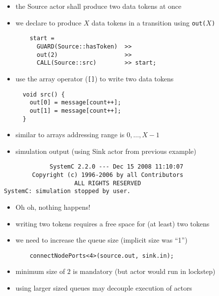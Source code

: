 \begin{frame}[fragile=singleslide]
\begin{itemize}
\item the Source actor shall produce two data tokens at once
\item we declare to produce $X$ data tokens in a transition  using \lstinline!out(!$X$\lstinline!)!
\begin{lstlisting}
    start = 
      GUARD(Source::hasToken)  >>
      out(2)                   >>
      CALL(Source::src)        >> start;
\end{lstlisting}
\item use the array operator (\lstinline![]!) to write two data tokens
\begin{lstlisting}
  void src() {
    out[0] = message[count++];
    out[1] = message[count++];
  }
\end{lstlisting}
\item similar to arrays addressing range is $0, \dots, X-1$
\end{itemize}
\end{frame}





\begin{frame}[fragile=singleslide]
\begin{itemize}
\item simulation output (using Sink actor from previous example)
\end{itemize}
\begin{lstlisting}
             SystemC 2.2.0 --- Dec 15 2008 11:10:07
        Copyright (c) 1996-2006 by all Contributors
                    ALL RIGHTS RESERVED
SystemC: simulation stopped by user.
\end{lstlisting}
\begin{itemize}
\item Oh oh, nothing happens!
\item writing two tokens requires a free space for (at least) two tokens
\item we need to increase the queue size (implicit size was ``1'')
\begin{lstlisting}
    connectNodePorts<4>(source.out, sink.in);
\end{lstlisting}
\item minimum size of $2$ is mandatory (but actor would run in lockstep)
\item using larger sized queues may decouple execution of actors
\end{itemize}
\end{frame}





